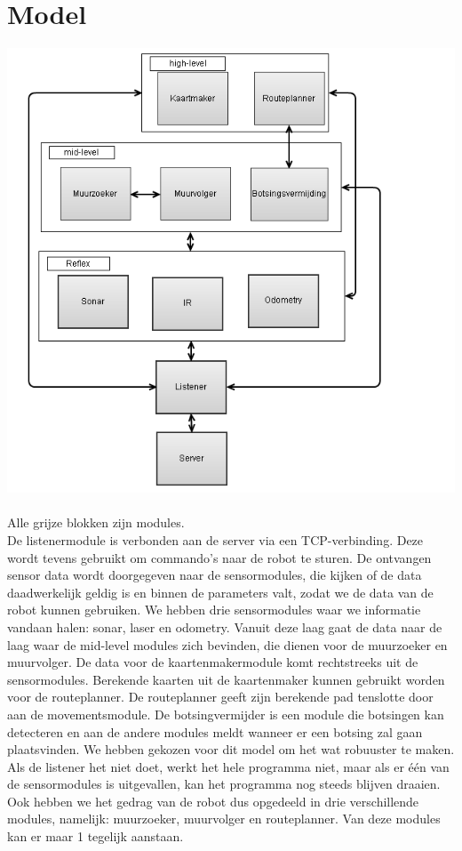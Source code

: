 \documentclass[a4paper,10pt]{article}
\begin{document}
\section{Model}
\includegraphics[scale = 0.5]{flowchart.PNG}\\\\
Alle grijze blokken zijn modules.\\
\newpage
De listenermodule is verbonden aan de server via een TCP-verbinding. Deze wordt tevens gebruikt om commando's naar de robot te sturen. De ontvangen sensor data wordt doorgegeven naar de sensormodules, die kijken of de data daadwerkelijk geldig is en binnen de parameters valt, zodat we de data van de robot kunnen gebruiken. We hebben drie sensormodules waar we informatie vandaan halen: sonar, laser en odometry. Vanuit deze laag gaat de data naar de laag waar de mid-level modules zich bevinden, die dienen voor de muurzoeker en muurvolger. De data voor de kaartenmakermodule komt rechtstreeks uit de sensormodules. Berekende kaarten uit de kaartenmaker kunnen gebruikt worden voor de routeplanner. De routeplanner geeft zijn berekende pad tenslotte door aan de movementsmodule. De botsingvermijder is een module die botsingen kan detecteren en aan de andere modules meldt wanneer er een botsing zal gaan plaatsvinden.
We hebben gekozen voor dit model om het wat robuuster te maken. Als de listener het niet doet, werkt het hele programma niet, maar als er \'{e}\'{e}n van de sensormodules is uitgevallen, kan het programma
nog steeds blijven draaien. Ook hebben we het gedrag van de robot dus opgedeeld in drie verschillende modules, namelijk: muurzoeker, muurvolger en routeplanner. Van deze modules kan er maar 1 tegelijk aanstaan. 
\end{document}

